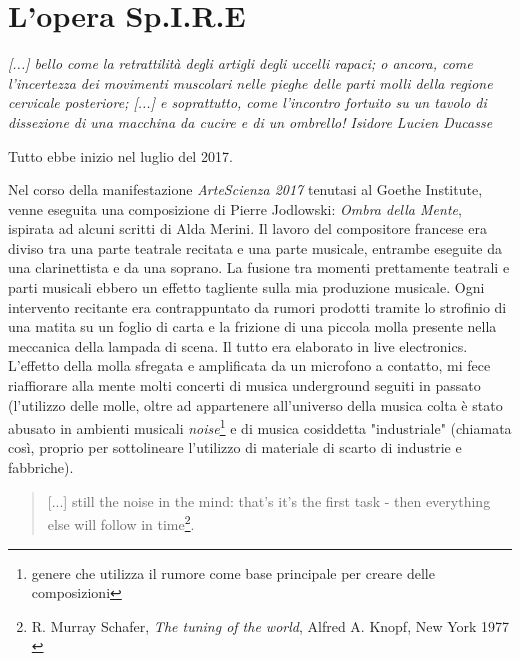 
\chapter{L'opera Sp.I.R.E}
\label{chp:L'opera Sp.I.R.E}

	\begin{flushright}
		\textit{[...] bello come la retrattilità degli artigli degli uccelli rapaci; o ancora, come l'incertezza dei movimenti muscolari nelle pieghe delle parti molli della regione cervicale posteriore; [...] e soprattutto, come l'incontro fortuito su un tavolo di dissezione di una macchina da cucire e di un ombrello!
		Isidore Lucien Ducasse}
	\end{flushright}

Tutto ebbe inizio nel luglio del 2017.

Nel corso della manifestazione \textit{ArteScienza 2017} tenutasi al Goethe Institute, venne eseguita una composizione di Pierre Jodlowski: \textit{Ombra della Mente}, ispirata ad alcuni scritti di Alda Merini. Il lavoro del compositore francese era diviso tra una parte teatrale recitata e una parte musicale, entrambe eseguite da una clarinettista e da una soprano. La fusione tra momenti prettamente teatrali e parti musicali ebbero un effetto tagliente sulla mia produzione musicale. Ogni intervento recitante era contrappuntato da rumori prodotti tramite lo strofinio di una matita su un foglio di carta e la frizione di una piccola molla presente nella meccanica della lampada di scena. Il tutto era elaborato in live electronics. L'effetto della molla sfregata e amplificata da un microfono a contatto, mi fece riaffiorare alla mente molti concerti di musica underground seguiti in passato (l'utilizzo delle molle, oltre ad appartenere all'universo della musica colta è stato abusato in ambienti musicali \textit{noise}\footnote{genere che utilizza il rumore come base principale per creare delle composizioni} e di musica cosiddetta "industriale" (chiamata così, proprio per sottolineare l'utilizzo di materiale di scarto di industrie e fabbriche).

\begin{small}
\begin{quotation}
[...] still the noise in the mind: that's it's the first task - then everything else will follow in time\footnote{R. Murray Schafer, \textit{The tuning of the world}, Alfred A. Knopf, New York 1977 \\}.
\end{quotation}
\end{small}

